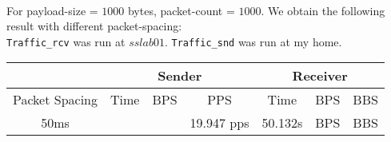 \documentclass[12pt]{article}
\newenvironment{problem}[2][Problem]{\begin{trivlist}
\item[\hskip \labelsep {\bfseries #1}\hskip \labelsep {\bfseries #2.}]}{\end{trivlist}}
\begin{document}
\begin{problem}{2} \ \\
For payload-size = $1000$ bytes, packet-count = $1000$. We obtain the following result with different packet-spacing:\\
\texttt{Traffic\_rcv} was run at $sslab01$. \texttt{Traffic\_snd} was run at my home. 
\begin{center}
	\begin{tabular}{|c|c|c|c|c|c|c|}
	\hline 
	& \multicolumn{3}{|c|}{Sender} & \multicolumn{3}{|c|}{Receiver}\\ \hline
	Packet Spacing 		   & Time& BPS& PPS& Time &BPS& BBS\\ \hline
	50ms 		  		   & &  & 19.947 pps& 50.132s &BPS& BBS\\ \hline

	\end{tabular}
\end{center}
\end{problem}
\begin{problem}{3}
\end{problem}
\end{document}
